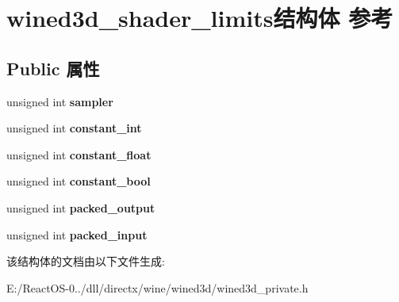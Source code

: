 \hypertarget{structwined3d__shader__limits}{}\section{wined3d\+\_\+shader\+\_\+limits结构体 参考}
\label{structwined3d__shader__limits}
\subsection*{Public 属性}
\begin{DoxyCompactItemize}
\item 
\mbox{\label{structwined3d__shader__limits_a8404a731677c1f069232a385acb77b12}} 
unsigned int {\bfseries sampler}
\item 
\mbox{\label{structwined3d__shader__limits_a29f757b306d20b25d94a0abb9c8c3624}} 
unsigned int {\bfseries constant\+\_\+int}
\item 
\mbox{\label{structwined3d__shader__limits_a688a79d2805a8f21994e40ce7cdace14}} 
unsigned int {\bfseries constant\+\_\+float}
\item 
\mbox{\label{structwined3d__shader__limits_af6475b1575890caefc787fdcd2d91885}} 
unsigned int {\bfseries constant\+\_\+bool}
\item 
\mbox{\label{structwined3d__shader__limits_a652ae3df09298dcd239c993311517538}} 
unsigned int {\bfseries packed\+\_\+output}
\item 
\mbox{\label{structwined3d__shader__limits_aa8853bb9b58779caa5e8771e46d9012c}} 
unsigned int {\bfseries packed\+\_\+input}
\end{DoxyCompactItemize}


该结构体的文档由以下文件生成\+:\begin{DoxyCompactItemize}
\item 
E\+:/\+React\+O\+S-\/0../dll/directx/wine/wined3d/wined3d\+\_\+private.\+h\end{DoxyCompactItemize}

